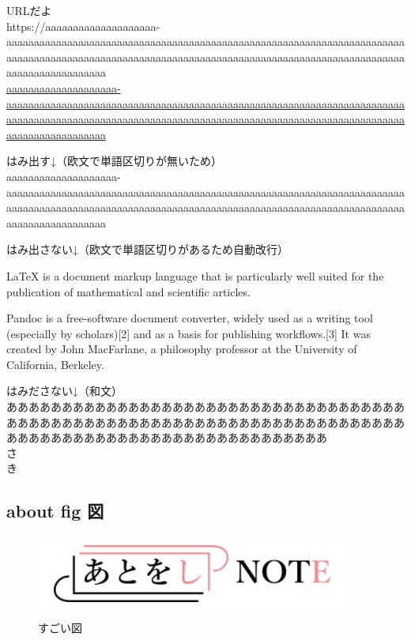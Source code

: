 \documentclass[
  10pt,
  a4paper,
  pandoc,
  titlepage]{ltjsarticle}
\begin{document}
URLだよ\\
https://aaaaaaaaaaaaaaaaaaaa-aaaaaaaaaaaaaaaaaaaaaaaaaaaaaaaaaaaaaaaaaaaaaaaaaaaaaaaaaaaaaaaaaaaaaaaaaaaaaaaaaaaaaaaaaaaaaaaaaaaaaaaaaaaaaaaaaaaaaaaaaaaaaaaaaaaaaaaaaaaaaaaaaaaaaaaaaaaaaaaaaa\\
\href{https://aaaaaaaaaaaaaaaaaaaa-aaaaaaaaaaaaaaaaaaaaaaaaaaaaaaaaaaaaaaaaaaaaaaaaaaaaaaaaaaaaaaaaaaaaaaaaaaaaaaaaaaaaaaaaaaaaaaaaaaaaaaaaaaaaaaaaaaaaaaaaaaaaaaaaaaaaaaaaaaaaaaaaaaaaaaaaaaaaaaaaaa}{aaaaaaaaaaaaaaaaaaaa-aaaaaaaaaaaaaaaaaaaaaaaaaaaaaaaaaaaaaaaaaaaaaaaaaaaaaaaaaaaaaaaaaaaaaaaaaaaaaaaaaaaaaaaaaaaaaaaaaaaaaaaaaaaaaaaaaaaaaaaaaaaaaaaaaaaaaaaaaaaaaaaaaaaaaaaaaaaaaaaaaa}

はみ出す↓（欧文で単語区切りが無いため）\\
aaaaaaaaaaaaaaaaaaaa-aaaaaaaaaaaaaaaaaaaaaaaaaaaaaaaaaaaaaaaaaaaaaaaaaaaaaaaaaaaaaaaaaaaaaaaaaaaaaaaaaaaaaaaaaaaaaaaaaaaaaaaaaaaaaaaaaaaaaaaaaaaaaaaaaaaaaaaaaaaaaaaaaaaaaaaaaaaaaaaaaa

はみ出さない↓（欧文で単語区切りがあるため自動改行）

LaTeX is a document markup language that is particularly well suited for
the publication of mathematical and scientific articles.

Pandoc is a free-software document converter, widely used as a writing
tool (especially by scholars){[}2{]} and as a basis for publishing
workflows.{[}3{]} It was created by John MacFarlane, a philosophy
professor at the University of California, Berkeley.

はみださない↓（和文）\\
あああああああああああああああああああああああああああああああああああああああああああああああああああああああああああああああああああああああああああああああああああああああああああああああああああああ\\
さ\\
き

\clearpage

\hypertarget{about-fig-ux56f3}{%
\subsection{about fig 図}\label{about-fig-ux56f3}}

\begin{figure}
\hypertarget{fig:sugoi}{%
\centering
\includegraphics{./images/test.png}
\caption[すごい図]{すごい図\footnotemark{}}\label{fig:sugoi}
}
\end{figure}
\end{document}
